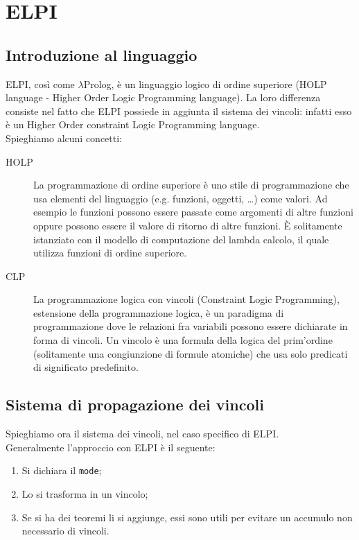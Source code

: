 \documentclass[12pt,a4paper,openright,twoside]{report}
\begin{document}
\section{ELPI}

\subsection{Introduzione al linguaggio}
ELPI, così come $\lambda$Prolog, è un linguaggio logico di ordine superiore (HOLP language - Higher Order Logic Programming language). La loro differenza consiste nel fatto che ELPI possiede in aggiunta il sistema dei vincoli: infatti esso è un Higher Order constraint Logic Programming language.\\
Spieghiamo alcuni concetti:
\begin{description}
 \item[HOLP] La programmazione di ordine superiore è uno stile di programmazione che usa elementi del linguaggio (e.g. funzioni, oggetti, \ldots) come valori. Ad esempio le funzioni possono essere passate come argomenti di altre funzioni oppure possono essere il valore di ritorno di altre funzioni. È solitamente istanziato con il modello di computazione del lambda calcolo, il quale utilizza funzioni di ordine superiore.
 \item[CLP] La programmazione logica con vincoli (Constraint Logic Programming), estensione della programmazione logica, è un paradigma di programmazione dove le relazioni fra variabili possono essere dichiarate in forma di vincoli. Un vincolo è una formula della logica del prim'ordine (solitamente una congiunzione di formule atomiche) che usa solo predicati di significato predefinito.
\end{description}

\subsection{Sistema di propagazione dei vincoli}
Spieghiamo ora il sistema dei vincoli, nel caso specifico di ELPI.\\
Generalmente l'approccio con ELPI è il seguente:
\begin{enumerate}
 \item Si dichiara il \verb"mode";
 \item Lo si trasforma in un vincolo;
 \item Se si ha dei teoremi li si aggiunge, essi sono utili per evitare un accumulo non necessario di vincoli.
\end{enumerate}
\end{document}
